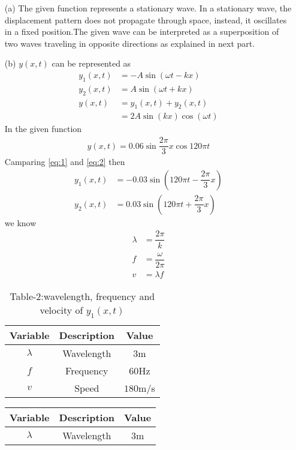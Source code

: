 \documentclass[journal,12pt,twocolumn]{IEEEtran}
\theoremstyle{remark}
\begin{document}
\begin{enumerate}
\item[(a)] The given function represents a stationary wave. In a stationary wave, the displacement pattern does not propagate through space, instead, it oscillates in a fixed position.The given wave can be interpreted as a superposition of two waves traveling in opposite directions as explained in next part.
\item[(b)] $y(x,t)$ can be represented as
\begin{align} 
y_1(x, t) &= -A \sin( \omega t - kx)\\ 
y_2(x, t) &= A \sin( \omega t + kx) \\
y(x,t) &= y_1(x,t) + y_2(x,t)\\
&= 2A\sin(kx)\cos(\omega t)
\label{eq:1}
\end{align} 
In the given function 
\begin{align}
y(x, t) = 0.06 \sin{\dfrac{2\pi}{3}x} \cos{120 \pi t} \label{eq:2}
\end{align}
Camparing \eqref{eq:1} and \eqref{eq:2} then
\begin{align} 
y_1(x, t) &= -0.03 \sin(120\pi t - \dfrac{2\pi}{3}x)\\ 
y_2(x, t) &= 0.03 \sin( 120\pi t + \dfrac{2\pi}{3}x)
\end{align}
we know
\begin{align}
\lambda &= \dfrac{2\pi}{k}\\
f &= \dfrac{\omega}{2\pi}\\
v &= \lambda f
\end{align}
\begin{table}[h]
  \centering
  \begin{tabular}{|c|c|c|}
    \hline
    Variable & Description & Value \\
    \hline
    $\lambda$ & Wavelength & $3$m\\
    \hline
    $f$ & Frequency & $60$Hz \\
    \hline
    $v$ & Speed & $180$m/s\\
    \hline
  \end{tabular}
  \caption{Table-2:wavelength, frequency and velocity of $y_1(x,t)$}
  \label{tab:mytable1}
\end{table}
\begin{table}[h]
  \centering
  \begin{tabular}{|c|c|c|}
    \hline
    Variable & Description & Value \\
    \hline
    $\lambda$ & Wavelength & $3$m\\

\end{tabular}
\end{table}
\end{enumerate}
\end{document}
